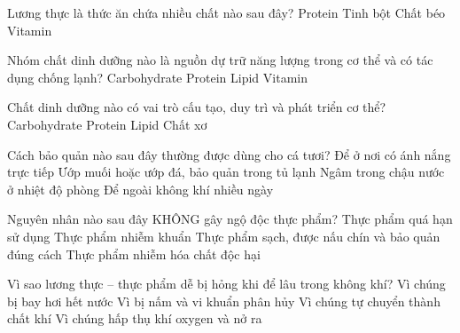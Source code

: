 \documentclass[Main.tex]{subfiles}
\begin{document}
\begin{ex}%
	Lương thực là thức ăn chứa nhiều chất nào sau đây?
	\choice
	{Protein}
	{\True Tinh bột}
	{Chất béo}
	{Vitamin}
\end{ex}

\begin{ex}%
	Nhóm chất dinh dưỡng nào là nguồn dự trữ năng lượng trong cơ thể và có tác dụng chống lạnh?
	\choice
	{Carbohydrate}
	{Protein}
	{\True Lipid}
	{Vitamin}
\end{ex}

\begin{ex}%
	Chất dinh dưỡng nào có vai trò cấu tạo, duy trì và phát triển cơ thể?
	\choice
	{Carbohydrate}
	{\True Protein}
	{Lipid}
	{Chất xơ}
\end{ex}

\begin{ex}%
	Cách bảo quản nào sau đây thường được dùng cho cá tươi?
	\choice
	{Để ở nơi có ánh nắng trực tiếp}
	{\True Ướp muối hoặc ướp đá, bảo quản trong tủ lạnh}
	{Ngâm trong chậu nước ở nhiệt độ phòng}
	{Để ngoài không khí nhiều ngày}
\end{ex}

\begin{ex}%
	Nguyên nhân nào sau đây KHÔNG gây ngộ độc thực phẩm?
	\choice
	{Thực phẩm quá hạn sử dụng}
	{Thực phẩm nhiễm khuẩn}
	{\True Thực phẩm sạch, được nấu chín và bảo quản đúng cách}
	{Thực phẩm nhiễm hóa chất độc hại}
\end{ex}

\begin{ex}%
	Vì sao lương thực -- thực phẩm dễ bị hỏng khi để lâu trong không khí?
	\choice
	{Vì chúng bị bay hơi hết nước}
	{\True Vì bị nấm và vi khuẩn phân hủy}
	{Vì chúng tự chuyển thành chất khí}
	{Vì chúng hấp thụ khí oxygen và nở ra}
\end{ex}
\end{document}
